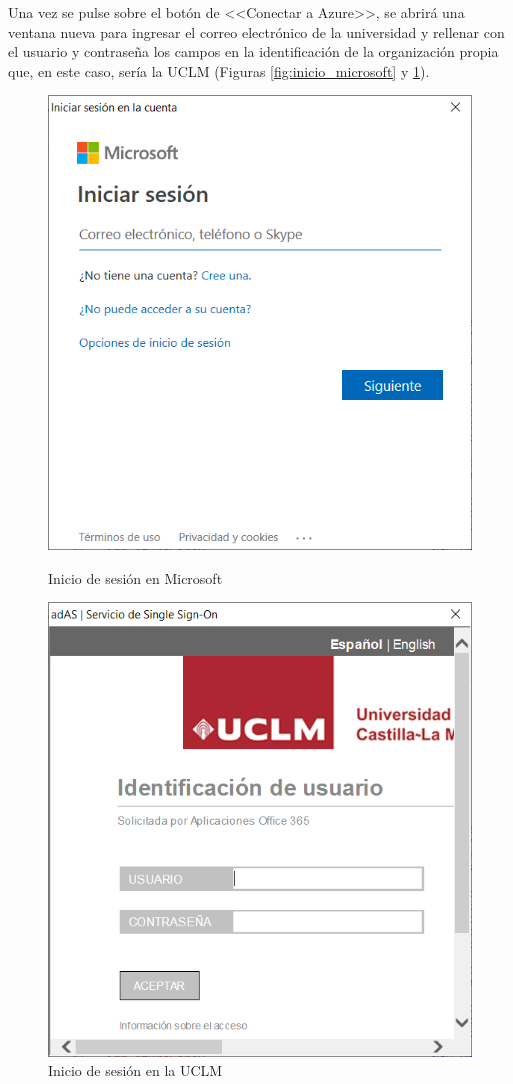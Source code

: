 \clearpage

Una vez se pulse sobre el botón de <<Conectar a Azure>>, se abrirá una ventana nueva para ingresar el correo electrónico de la universidad y rellenar con el usuario y contraseña los campos en la identificación de la organización propia que, en este caso, sería la \acs{UCLM} (Figuras \ref{fig:inicio_microsoft} y \ref{fig:inicio_uclm}).

\begin{figure}
    \centering
    \begin{minipage}{.5\textwidth}
        \centering
        \includegraphics[width=0.8\linewidth]{figures/images/inicio_microsoft.PNG}
        \caption{Inicio de sesión en Microsoft}
        \label{fig:inicio_microsoft}
    \end{minipage}%
    \begin{minipage}{.5\textwidth}
        \centering
        \includegraphics[width=0.8\linewidth]{figures/images/inicio_uclm.PNG}
        \caption{Inicio de sesión en la \acs{UCLM}}
        \label{fig:inicio_uclm}
    \end{minipage}
\end{figure}

